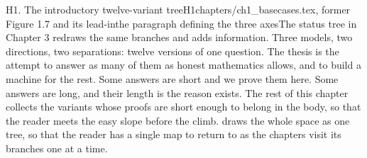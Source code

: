 \begin{offcut}{H1. The introductory twelve-variant tree}{H1}{chapters/ch1\_basecases.tex, former Figure 1.7 and its lead-in}{the paragraph defining the three axes}{The status tree in Chapter 3 redraws the same branches and adds information.}
Three models, two directions, two separations: twelve versions of one question. The thesis is the attempt to answer as many of them as honest mathematics allows, and to build a machine for the rest. Some answers are short and we prove them here. Some answers are long, and their length is the reason  exists. The rest of this chapter collects the variants whose proofs are short enough to belong in the body, so that the reader meets the easy slope before the climb.  draws the whole space as one tree, so that the reader has a single map to return to as the chapters visit its branches one at a time.


\end{offcut}
